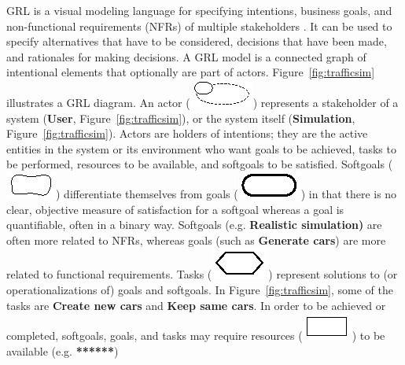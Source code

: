 GRL is a visual modeling language for specifying intentions, business goals, and non-functional requirements (NFRs) of multiple stakeholders \cite{Amyot:2010:EGM:1841349.1841356}. It can be used to specify alternatives that have to be considered, decisions that have been made, and rationales for making decisions. A GRL model is a connected graph of intentional elements that optionally are part of actors. Figure~\ref{fig:trafficsim} illustrates a GRL diagram. An actor (\includegraphics[scale=1]{img/actor}) represents a stakeholder of a system (\textbf{User}, Figure~\ref{fig:trafficsim}), or the system itself (\textbf{Simulation}, Figure~\ref{fig:trafficsim}). Actors are holders of intentions; they are the active entities in the system or its environment who want goals to be achieved, tasks to be performed, resources to be available, and softgoals to be satisfied. Softgoals (\includegraphics[scale=1]{img/softgoal}) differentiate themselves from goals (\includegraphics[scale=1]{img/goal}) in that there is no clear, objective measure of satisfaction for a softgoal whereas a goal is quantifiable, often in a binary way. Softgoals (e.g. \textbf{Realistic simulation)} are often more related to NFRs, whereas goals (such as \textbf{Generate cars}) are more related to functional requirements. Tasks (\includegraphics[scale=1]{img/task}) represent solutions to (or operationalizations of) goals and softgoals. In Figure~\ref{fig:trafficsim}, some of the tasks are \textbf{Create new cars} and \textbf{Keep same cars}. In order to be achieved or completed, softgoals, goals, and tasks may require resources (\includegraphics[scale=1]{img/resource}) to be available (e.g. \textbf{******})

